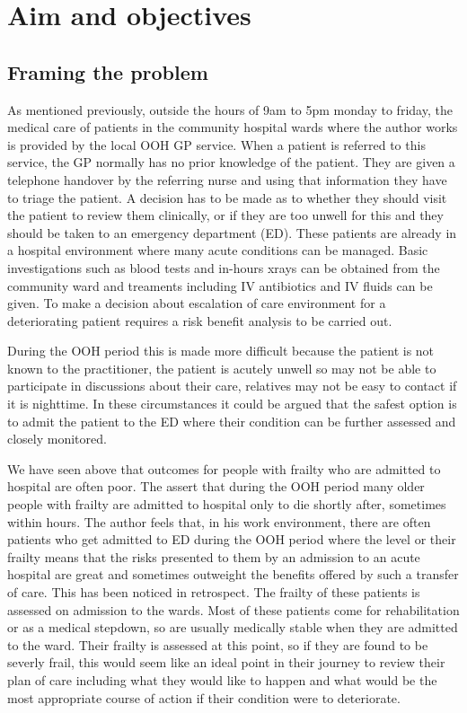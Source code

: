 \documentclass
[
	12pt,
	a4paper,
	oneside,
]{article}
\begin{document}
\section{Aim and objectives}
\subsection{Framing the problem}
As mentioned previously, outside the hours of 9am to 5pm monday to friday, the medical
care of patients in the community hospital wards where the author works is provided
by the local OOH GP service. When a patient
is referred to this service, the GP normally has no prior knowledge of the patient. They are
given a telephone handover by the referring nurse and using that information
they have to triage the patient. A decision has to be made as to whether they should visit
the patient to review them clinically, or if they are too unwell for this and they 
should be taken to an emergency department (ED). These patients
are already in a hospital environment where many acute conditions can be managed.
Basic investigations such as blood tests and in-hours xrays can be obtained from the community
ward and treaments including IV antibiotics and IV fluids can be given.
To make a decision about escalation of care environment for a deteriorating patient
requires a risk benefit analysis to be carried out. 

During the OOH period this is 
made more difficult because the patient is not known to the practitioner, the patient
is acutely unwell so may not be able to participate in discussions about their care,
relatives may not be easy to contact if it is nighttime. In these circumstances it could
be argued that the safest option is to admit the patient to the ED where their 
condition can be further assessed and closely monitored. 

We have seen above that outcomes for people with frailty who are admitted to hospital
are often poor. The \textcite{silver:12} assert that during the OOH period many older
people with frailty are admitted to hospital only to die shortly after, sometimes within
hours. The author feels that, in his work environment, there are often 
patients who get admitted to ED during the OOH period where the level or their frailty
means that the risks presented to them by an admission to an acute hospital are great
and sometimes outweight the benefits offered by such a transfer of care. This has
been noticed in retrospect. The frailty of these patients is assessed on admission
to the wards. Most of these patients come for rehabilitation or as a medical stepdown,
so are usually medically stable when they are admitted to the ward. Their frailty 
is assessed at this point, so if they are found to be severly frail, this would
seem like an ideal point in their journey to review their plan of care including
what they would like to happen and what would be the most appropriate course of 
action if their condition were to deteriorate.
\end{document}
